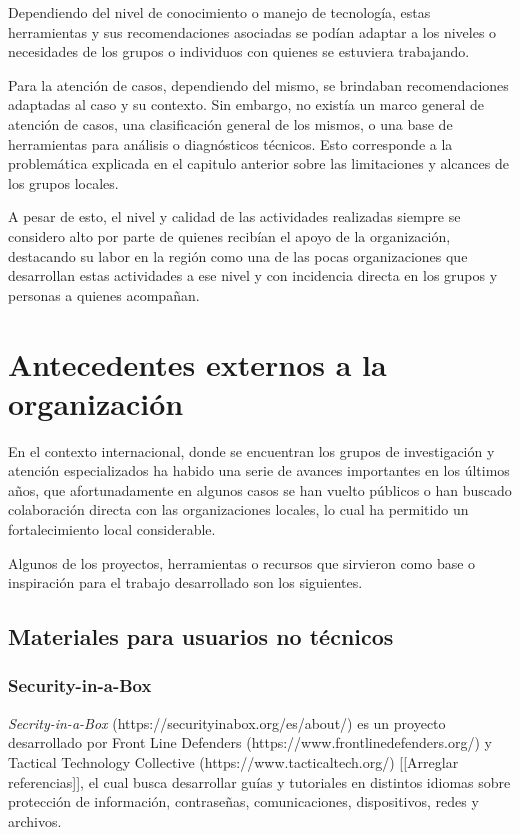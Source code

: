 \documentclass[12pt]{caltech_thesis}
\begin{document}
Dependiendo del nivel de conocimiento o manejo de tecnología, estas herramientas y sus recomendaciones asociadas se podían adaptar a los niveles o necesidades de los grupos o individuos con quienes se estuviera trabajando.

Para la atención de casos, dependiendo del mismo, se brindaban recomendaciones adaptadas al caso y su contexto. Sin embargo, no existía un marco general de atención de casos, una clasificación general de los mismos, o una base de herramientas para análisis o diagnósticos técnicos. Esto corresponde a la problemática explicada en el capitulo anterior sobre las limitaciones y alcances de los grupos locales.

A pesar de esto, el nivel y calidad de las actividades realizadas siempre se considero alto por parte de quienes recibían el apoyo de la organización, destacando su labor en la región como una de las pocas organizaciones que desarrollan estas actividades a ese nivel y con incidencia directa en los grupos y personas a quienes acompañan.

\section{Antecedentes externos a la organización}

En el contexto internacional, donde se encuentran los grupos de investigación y atención especializados ha habido una serie de avances importantes en los últimos años, que afortunadamente en algunos casos se han vuelto públicos o han buscado colaboración directa con las organizaciones locales, lo cual ha permitido un fortalecimiento local considerable.

Algunos de los proyectos, herramientas o recursos que sirvieron como base o inspiración para el trabajo desarrollado son los siguientes.

\subsection{Materiales para usuarios no técnicos}

\subsubsection{Security-in-a-Box}

\textit{Secrity-in-a-Box} (https://securityinabox.org/es/about/) es un proyecto desarrollado por Front Line Defenders (https://www.frontlinedefenders.org/) y Tactical Technology Collective (https://www.tacticaltech.org/) [[Arreglar referencias]], el cual busca desarrollar guías y tutoriales en distintos idiomas sobre protección de información, contraseñas, comunicaciones, dispositivos, redes y archivos.
\end{document}
